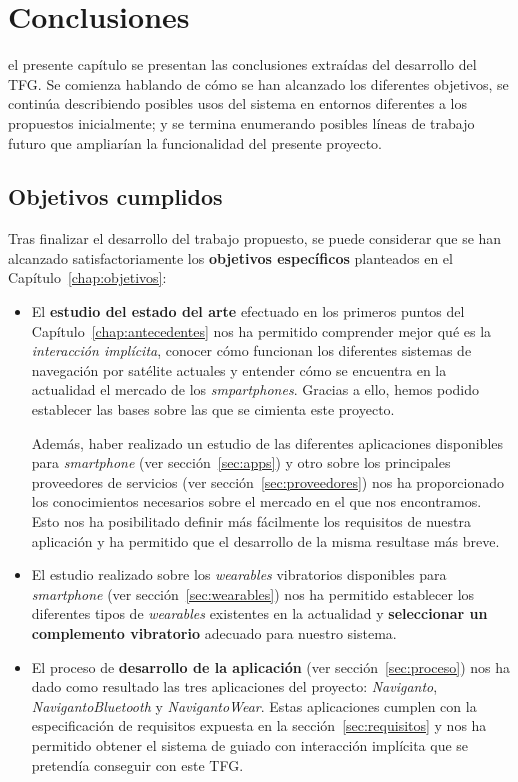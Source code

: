\chapter{Conclusiones}
\label{chap:conclusiones}

 el presente capítulo se presentan las conclusiones extraídas del desarrollo del
\acs{TFG}. Se comienza hablando de cómo se han alcanzado los diferentes objetivos, se continúa
describiendo posibles usos del sistema en entornos diferentes a los propuestos inicialmente; y se
termina enumerando posibles líneas de trabajo futuro que ampliarían la funcionalidad del presente
proyecto.

\section{Objetivos cumplidos}

Tras finalizar el desarrollo del trabajo propuesto, se puede considerar que se han alcanzado
satisfactoriamente los \textbf{objetivos específicos} planteados en el
Capítulo~\ref{chap:objetivos}:

\begin{itemize}
  \item El \textbf{estudio del estado del arte} efectuado en los primeros puntos del
    Capítulo~\ref{chap:antecedentes} nos ha permitido comprender mejor qué es la \emph{interacción
      implícita}, conocer cómo funcionan los diferentes sistemas de navegación por satélite actuales
    y entender cómo se encuentra en la actualidad el mercado de los \emph{smpartphones}. Gracias a
    ello, hemos podido establecer las bases sobre las que se cimienta este proyecto.

    Además, haber realizado un estudio de las diferentes aplicaciones disponibles para
    \emph{smartphone} (ver sección~\ref{sec:apps}) y otro sobre los principales proveedores de
    servicios (ver sección~\ref{sec:proveedores}) nos ha proporcionado los conocimientos necesarios
    sobre el mercado en el que nos encontramos. Esto nos ha posibilitado definir más fácilmente los
    requisitos de nuestra aplicación y ha permitido que el desarrollo de la misma resultase más
    breve.

  \item El estudio realizado sobre los \emph{wearables} vibratorios disponibles para
    \emph{smartphone} (ver sección~\ref{sec:wearables}) nos ha permitido establecer los diferentes
    tipos de \emph{wearables} existentes en la actualidad y \textbf{seleccionar un complemento
      vibratorio} adecuado para nuestro sistema.

  \item El proceso de \textbf{desarrollo de la aplicación} (ver sección~\ref{sec:proceso}) nos ha
    dado como resultado las tres aplicaciones del proyecto: \emph{Naviganto},
    \emph{NavigantoBluetooth} y \emph{NavigantoWear}. Estas aplicaciones cumplen con la
    especificación de requisitos expuesta en la sección~\ref{sec:requisitos} y nos ha permitido
    obtener el sistema de guiado con interacción implícita que se pretendía conseguir con este
    \acs{TFG}.

\end{itemize}

